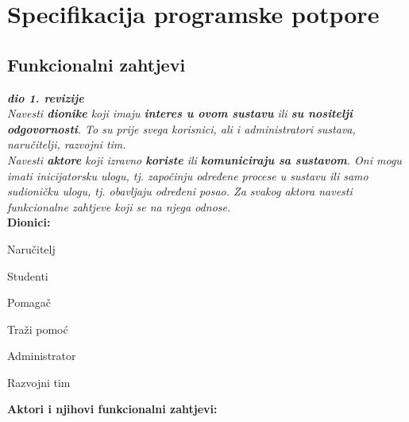 \chapter{Specifikacija programske potpore}
		
	\section{Funkcionalni zahtjevi}
			
			\textbf{\textit{dio 1. revizije}}\\
			
			\textit{Navesti \textbf{dionike} koji imaju \textbf{interes u ovom sustavu} ili  \textbf{su nositelji odgovornosti}. To su prije svega korisnici, ali i administratori sustava, naručitelji, razvojni tim.}\\
				
			\textit{Navesti \textbf{aktore} koji izravno \textbf{koriste} ili \textbf{komuniciraju sa sustavom}. Oni mogu imati inicijatorsku ulogu, tj. započinju određene procese u sustavu ili samo sudioničku ulogu, tj. obavljaju određeni posao. Za svakog aktora navesti funkcionalne zahtjeve koji se na njega odnose.}\\
			
			
			\noindent \textbf{Dionici:}
			
			\begin{packed_enum}
				\item Naručitelj
				\item Studenti 
				    \begin{packed_enum}
				        \item Pomagač
				        \item Traži pomoć
				    \end{packed_enum}
				\item Administrator
				\item Razvojni tim
				
			\end{packed_enum}
			
			\noindent \textbf{Aktori i njihovi funkcionalni zahtjevi:}
			

